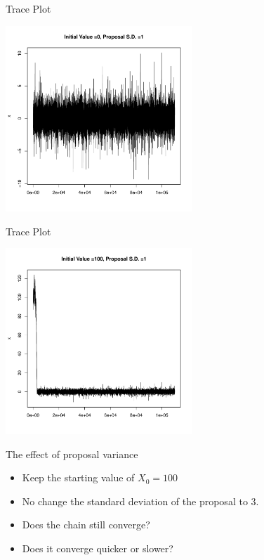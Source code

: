 \documentclass[10pt]{beamer}
\begin{document}
\begin{frame}{Trace Plot}
\begin{center}
\includegraphics[height=7cm]{./Pics/sp1.pdf}
\end{center}
\end{frame}
\begin{frame}{Trace Plot}
\begin{center}
\includegraphics[height=7cm]{./Pics/sp2.pdf}
\end{center}
\end{frame}
\begin{frame}{The effect of proposal variance}
\begin{itemize}
\item Keep the starting value of $X_0=100$

\item No change the standard deviation of the proposal to 3.

\item Does the chain still converge?

\item Does it converge quicker or slower?
\end{itemize}
\end{frame}
\end{document}
